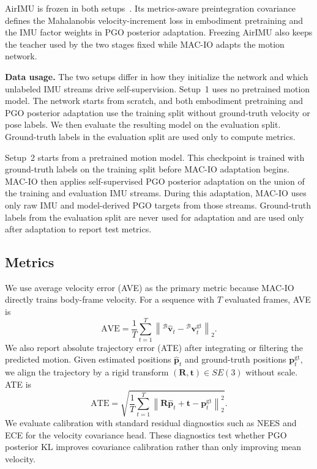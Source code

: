 AirIMU is frozen in both setups~\cite{qiu2023airimu}.
Its metrics-aware preintegration covariance defines the Mahalanobis velocity-increment loss in embodiment pretraining and the IMU factor weights in PGO posterior adaptation.
Freezing AirIMU also keeps the teacher used by the two stages fixed while MAC-IO adapts the motion network.

\textbf{Data usage.}
The two setups differ in how they initialize the network and which unlabeled IMU streams drive self-supervision.
Setup~1 uses no pretrained motion model.
The network starts from scratch, and both embodiment pretraining and PGO posterior adaptation use the training split without ground-truth velocity or pose labels.
We then evaluate the resulting model on the evaluation split.
Ground-truth labels in the evaluation split are used only to compute metrics.

Setup~2 starts from a pretrained motion model.
This checkpoint is trained with ground-truth labels on the training split before MAC-IO adaptation begins.
MAC-IO then applies self-supervised PGO posterior adaptation on the union of the training and evaluation IMU streams.
During this adaptation, MAC-IO uses only raw IMU and model-derived PGO targets from those streams.
Ground-truth labels from the evaluation split are never used for adaptation and are used only after adaptation to report test metrics.

\subsection{Metrics}
\label{sec:macio:metrics}

We use average velocity error (AVE) as the primary metric because MAC-IO directly trains body-frame velocity.
For a sequence with $T$ evaluated frames, AVE is
\begin{equation}
\mathrm{AVE}
=
\frac{1}{T}\sum_{t=1}^{T}
\left\|
{}^\mathcal{B}\hat{\mathbf{v}}_t
-
{}^\mathcal{B}\mathbf{v}^{\mathrm{gt}}_t
\right\|_2 .
\end{equation}
We also report absolute trajectory error (ATE) after integrating or filtering the predicted motion.
Given estimated positions $\hat{\mathbf{p}}_t$ and ground-truth positions $\mathbf{p}^{\mathrm{gt}}_t$, we align the trajectory by a rigid transform $(\mathbf{R},\mathbf{t})\in SE(3)$ without scale.
ATE is
\begin{equation}
\mathrm{ATE}
=
\sqrt{
\frac{1}{T}\sum_{t=1}^{T}
\left\|
\mathbf{R}\hat{\mathbf{p}}_t+\mathbf{t}
-
\mathbf{p}^{\mathrm{gt}}_t
\right\|_2^2
}.
\end{equation}
We evaluate calibration with standard residual diagnostics such as NEES and ECE for the velocity covariance head.
These diagnostics test whether PGO posterior KL improves covariance calibration rather than only improving mean velocity.

